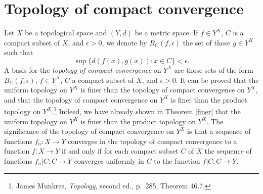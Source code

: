 \documentclass{article}
\theoremstyle{definition}
\begin{document}
\section{Topology of compact convergence}
Let $X$ be a topological space and $(Y,d)$ be a metric space. If $f \in Y^X$,
 $C$ is a compact subset of $X$, and $\epsilon>0$, we denote by $B_C(f,\epsilon)$ the set of those $g \in Y^X$ such that
 \[
 \sup \{d(f(x),g(x)):x \in C\} <\epsilon.
 \]
 A basis for the {\em topology of compact convergence} on $Y^X$ are those sets of the form $B_C(f,\epsilon)$,
 $f \in Y^X$, $C$ a compact subset of $X$, and $\epsilon>0$. It can be proved
 that the uniform topology on $Y^X$ is finer than the topology of compact convergence on $Y^X$, and that
 the topology of compact convergence on $Y^X$ is finer than the product topology on $Y^X$.\footnote{James Munkres,
 {\em Topology}, second ed., p.~285, Theorem 46.7.} Indeed, we have already shown 
 in Theorem \ref{finer}
 that the uniform topology on $Y^X$ is finer than the product topology on $Y^X$.
 The significance of the topology of compact convergence on $Y^X$ is that a sequence of functions $f_n:X \to Y$ converges
 in the topology of compact convergence to a function $f:X \to Y$ if and only if for each compact subset $C$ of $X$ the sequence of
 functions
 $f_n|C:C \to Y$ converges uniformly in $C$ to the function $f|C:C \to Y$.
\end{document}
